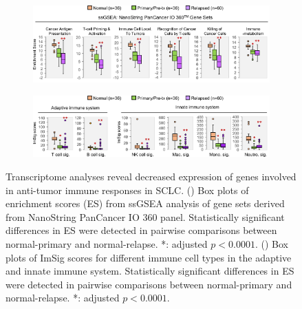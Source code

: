 \begin{figure}[htb]
    \centering
    \begin{subfigure}{0.84\textwidth}
        \includegraphics[width=\linewidth,keepaspectratio]{images/sclc/ssgsea_all_boxplot}
        \caption{}\label{fig:sclc:ssgsea_all_boxplot}
    \end{subfigure}
    
    \begin{subfigure}{0.84\textwidth}
        \includegraphics[width=\linewidth,keepaspectratio]{images/sclc/imsig_all_boxplot}
        \caption{}\label{fig:sclc:imsig_all_boxplot}
    \end{subfigure}
    \vspace{-0.5cm}
    \caption[Decreased expression of immune-associated genes in advanced SCLC.]{Transcriptome analyses reveal decreased expression of genes involved in anti-tumor immune responses in SCLC\@. () Box plots of enrichment scores (ES) from ssGSEA analysis of gene sets derived from NanoString PanCancer IO 360 panel. Statistically significant differences in ES were detected in pairwise comparisons between normal-primary and normal-relapse. *: adjusted $p<0.0001$. () Box plots of ImSig scores for different immune cell types in the adaptive and innate immune system. Statistically significant differences in ES were detected in pairwise comparisons between normal-primary and normal-relapse. *: adjusted $p<0.0001$.}
    \label{fig:sclc:immune_all_ssgsea_imsig}
\end{figure}
